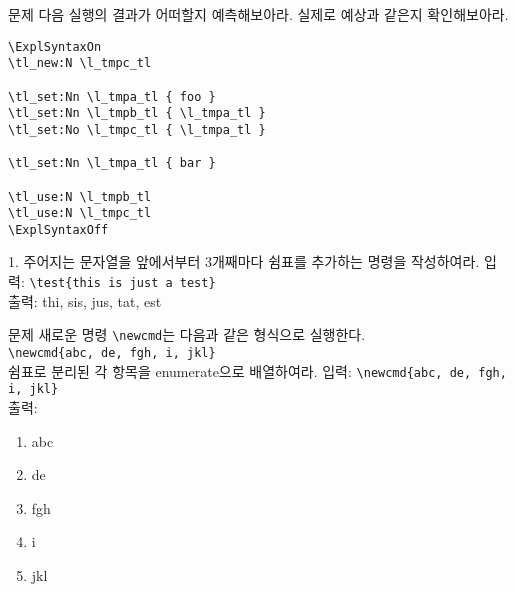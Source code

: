 \documentclass[a4paper,amsmath,itemph]{oblivoir}
\begin{document}
\vfill

\clearpage


\begin{questiona}{문제}
다음 실행의 결과가 어떠할지 예측해보아라. 실제로 예상과 같은지 확인해보아라.
\end{questiona}

\begin{verbatim}
\ExplSyntaxOn
\tl_new:N \l_tmpc_tl

\tl_set:Nn \l_tmpa_tl { foo }
\tl_set:Nn \l_tmpb_tl { \l_tmpa_tl }
\tl_set:No \l_tmpc_tl { \l_tmpa_tl }

\tl_set:Nn \l_tmpa_tl { bar }

\tl_use:N \l_tmpb_tl
\tl_use:N \l_tmpc_tl
\ExplSyntaxOff
\end{verbatim}

\vfill

\begin{questionp}
 1. 주어지는 문자열을 앞에서부터 3개째마다 쉼표를 추가하는 명령을 작성하여라.
\tcblower
입력: \verb|\test{this is just a test}| \\
출력: thi, sis, jus, tat, est
\end{questionp}


\vfill

\clearpage

\begin{questiona}{문제}
새로운 명령 \verb|\newcmd|는 다음과 같은 형식으로 실행한다.\\
\verb|\newcmd{abc, de, fgh, i, jkl}|\\
쉼표로 분리된 각 항목을 enumerate으로 배열하여라.
\tcblower
입력: \verb|\newcmd{abc, de, fgh, i, jkl}| \\
출력:
\begin{enumerate} \tightlist
\item abc
\item de
\item fgh
\item i
\item jkl
\end{enumerate}
\end{questiona}

\vfill
\end{document}
